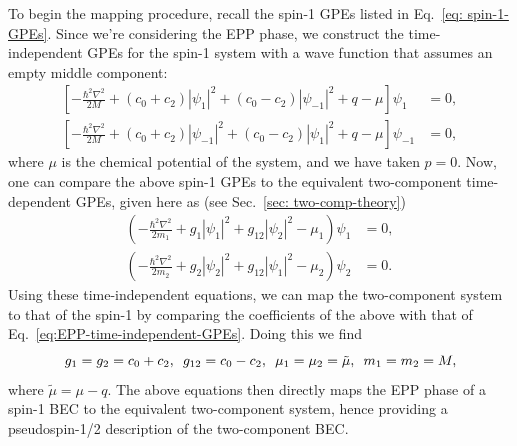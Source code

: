 To begin the mapping procedure, recall the spin-1 GPEs listed in
Eq.~\eqref{eq: spin-1-GPEs}.
Since we're considering the EPP phase, we construct the time-independent
GPEs for the spin-1 system with a wave function that assumes an empty middle
component:
\begin{equation}
    \begin{aligned}
        \left[-\frac{\hbar^2\nabla^2}{2M}
            + (c_0 + c_2)|\psi_1|^2 + (c_0 - c_2)|\psi_{-1}|^2
        + q - \mu\right]\psi_1    & = 0, \\
        \left[-\frac{\hbar^2\nabla^2}{2M}
            + (c_0 + c_2)|\psi_{-1}|^2 + (c_0 - c_2)|\psi_1|^2
        + q - \mu\right]\psi_{-1} & = 0,
    \end{aligned}
    \label{eq:EPP-time-independent-GPEs}
\end{equation}
where \( \mu \) is the chemical potential of the system, and we have taken
\( p=0 \).
Now, one can compare the above spin-1 GPEs to the equivalent two-component
time-dependent GPEs, given here as (see Sec.~\ref{sec: two-comp-theory})
\begin{equation}
    \begin{aligned}
        \left(-\frac{\hbar^2\nabla^2}{2m_1} + g_1|\psi_1|^2
        +g_{12}|\psi_2|^2 - \mu_1\right)\psi_1 & = 0, \\
        \left(-\frac{\hbar^2\nabla^2}{2m_2} + g_2|\psi_2|^2
        +g_{12}|\psi_1|^2 - \mu_2\right)\psi_2 & = 0.
    \end{aligned}
    \label{eq:two-comp-time-independent-gpes}
\end{equation}
Using these time-independent equations, we can map the two-component system
to that of the spin-1 by comparing the coefficients of the above with that of
Eq.~\eqref{eq:EPP-time-independent-GPEs}.
Doing this we find
\begin{equation}
    g_1=g_2=c_0+c_2, \enskip g_{12} = c_0-c_2, \enskip \mu_1=\mu_2=\tilde{\mu},
    \enskip m_1=m_2=M,
\end{equation}
where \( \tilde{\mu} = \mu - q \).
The above equations then directly maps the EPP phase of a spin-1 BEC to the
equivalent two-component system, hence providing a pseudospin-1/2 description
of the two-component BEC\@.

